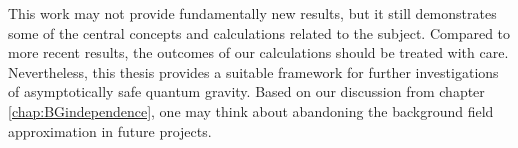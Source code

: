 This work may not provide fundamentally new results, but it still demonstrates some of the central concepts and calculations related to the subject. Compared to more recent results, the outcomes of our calculations should be treated with care. Nevertheless, this thesis provides a suitable framework for further investigations of asymptotically safe quantum gravity. Based on our discussion from chapter \ref{chap:BGindependence}, one may think about abandoning the background field approximation in future projects.